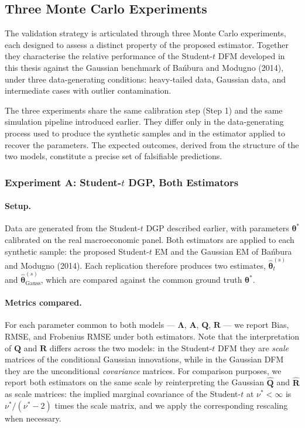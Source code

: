 \documentclass[11pt, a4paper, oneside]{article}
\newcommand{\mL}{\boldsymbol{\Lambda}}
\newcommand{\mA}{\mathbf{A}}
\newcommand{\mR}{\mathbf{R}}
\begin{document}
\newpage
\subsection{Three Monte Carlo Experiments}
\label{subsec:mc-experiments}

The validation strategy is articulated through three Monte Carlo
experiments, each designed to assess a distinct property of the
proposed estimator. Together they characterise the relative
performance of the Student-$t$ DFM developed in this thesis against
the Gaussian benchmark of Bańbura and Modugno (2014), under three
data-generating conditions: heavy-tailed data, Gaussian data, and
intermediate cases with outlier contamination.

The three experiments share the same calibration step (Step 1) and
the same simulation pipeline introduced earlier. They differ only in
the data-generating process used to produce the synthetic samples
and in the estimator applied to recover the parameters. The
expected outcomes, derived from the structure of the two models,
constitute a precise set of falsifiable predictions.

\subsubsection{Experiment A: Student-$t$ DGP, Both Estimators}
\label{subsubsec:exp-A}

\paragraph{Setup.}
Data are generated from the Student-$t$ DGP described earlier, with
parameters $\boldsymbol{\theta}^*$ calibrated on the real
macroeconomic panel. Both estimators are applied to each synthetic
sample: the proposed Student-$t$ EM and the Gaussian EM of Bańbura
and Modugno (2014). Each replication therefore produces two
estimates, $\hat{\boldsymbol{\theta}}^{(s)}_{t}$ and
$\hat{\boldsymbol{\theta}}^{(s)}_{\mathrm{Gauss}}$, which are
compared against the common ground truth $\boldsymbol{\theta}^*$.

\paragraph{Metrics compared.}
For each parameter common to both models — $\mL$, $\mA$,
$\mathbf{Q}$, $\mR$ — we report Bias, RMSE, and Frobenius RMSE under
both estimators. Note that the interpretation of $\mathbf{Q}$ and
$\mR$ differs across the two models: in the Student-$t$ DFM they
are \emph{scale} matrices of the conditional Gaussian innovations,
while in the Gaussian DFM they are the unconditional \emph{covariance}
matrices. For comparison purposes, we report both estimators on the
same scale by reinterpreting the Gaussian $\hat{\mathbf{Q}}$ and
$\hat{\mR}$ as scale matrices: the implied marginal covariance of
the Student-$t$ at $\nu^* < \infty$ is $\nu^* / (\nu^* - 2)$ times
the scale matrix, and we apply the corresponding rescaling when
necessary.
\end{document}
